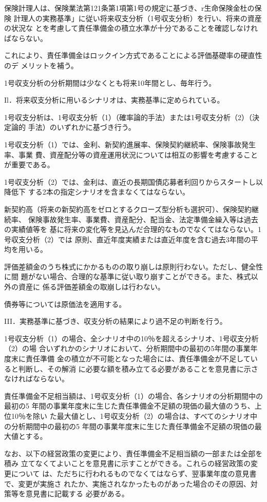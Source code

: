 \documentclass[report,gutter=10mm,fore-edge=10mm,uplatex,dvipdfmx]{jlreq}
\begin{document}
保険計理人は、保険業法第121条第1項第1号の規定に基づき、r生命保険金杜の保険
計理人の実務基準」に従い将来収支分析（1号収支分析）を行い、将来の資産の状況な
とを考慮して責任準備金の積立水準が十分であることを確認しなければならない。

これにより、責任準備金はロックイン方式であることによる評価基礎率の硬直性のデ
メリットを補う。

1号収支分析の分析期間は少なくとも将来10年間とし、毎年行う。

Il．将来収支分析に用いるシナリオは、実務基準に定められている。

1号収支分析は、1号収支分析（1）（確率論的手法）または1号収支分析（2）（決定論的
手法）のいずれかに基づき行う。

1号収支分析（1）では、金利、新契約進展率、保険契約継続率、保険事故発生率、事業
費、資産配分等の資産運用状況については相互の影響を考慮することが重要である。

1号収支分析（2）では、金利は、直近の長期国債応募者利回りからスタートし以降低下
する2本の指定シナリオを含まなくてはならない。

新契約高（将来の新契約高をゼロとするクローズ型分析も選択可）、保険契約継続率、
保険事故発生率、事業費、資産配分、配当金、法定準備金繰入等は過去の実績値等を
基に将来の変化等を見込んだ合理的なものでなくてはならない。1号収支分析（2）では
原則、直近年度実績または直近年度を含む過去3年間の平均を用いる。

評価差額金のうち株式にかかるものの取り崩しは原則行わない。ただし、健全性に間
題がない場合、合理的な基準に従い取り崩すことができる。また、株式以外の資産に
係る評価差額金の取崩しは行わない。

債券等については原価法を適用する。

III．実務基準に基づき、収支分析の結果により過不足の判断を行う。

1号収支分析（1）の場合、全シナリオ中の10％を超えるシナリオ、1号収支分析（2）の場
合いずれかのシナリオにおいて、分析期間中の最初の5年間の事業年度末に責任準備
金の積立が不可能となった場合には、責任準備金が不足していると判断し、その解消
に必要な額を積み立てる必要があることを意見書に示さなければならない。

責任準備金不足相当額は、1号収支分析（1）の場合、各シナリオの分析期間中の最初の5
年間の事業年度末に生じた責任準備金不足額の現価の最大値のうち、上位10％を除い
た最大値とし、1号収支分析（2）の場合は、すべてのシナリオ中の分析期間中の最初の5
年間の事業年度末に生じた責任準備金不足額の現価の最大値とする。

なお、以下の経営政策の変更により、責任準備金不足相当額の一部または全部を積み
立てなくてよいことを意見書に示すことができる。これらの経営政策の変更について
は、ただちに行われるものでなくてはならず、翌事業年度の意見書で、変更が実施さ
れたか、実施されなかったものがあった場合のその原因、対策等を意見書に記載する
必要がある。
\end{document}
